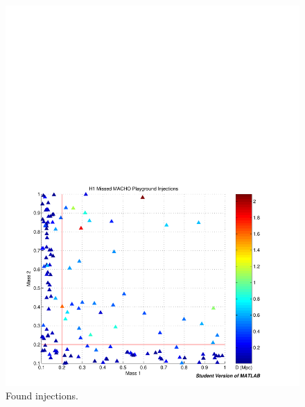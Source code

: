 \begin{figure}[p]
\begin{center}
\includegraphics[width=\textwidth]{analysis/figures/m1m2_missed}
\end{center}
\caption{\label{f:m1m2_missed}%
Found injections.
}
\end{figure}


